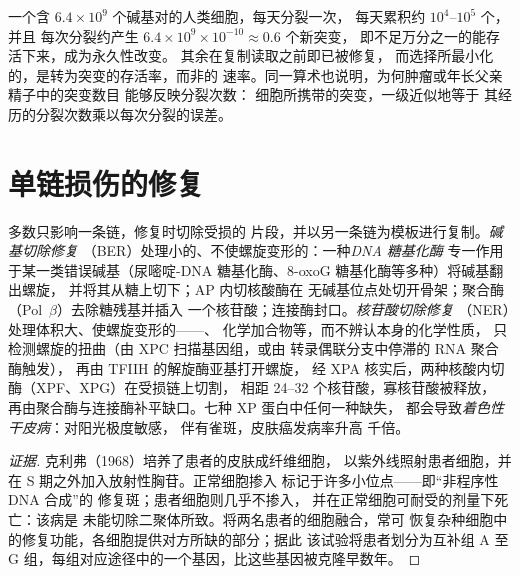 \begin{example}[损伤与突变]\label{ex:b3:dna-repair:numbers}
一个含 $6.4\times 10^{9}$ 个碱基对的人类细胞，每天分裂一次，
每天累积约 $10^{4}$--$10^{5}$ 个，并且
每次分裂约产生 $6.4\times 10^{9}\times 10^{-10} \approx 0.6$ 个新突变，
即不足万分之一的能存活下来，成为永久性改变。
其余在复制读取之前即已被修复，
而选择所最小化的，是转为突变的存活率，而非的
速率。同一算术也说明，为何肿瘤或年长父亲精子中的突变数目
能够反映分裂次数：
细胞所携带的突变，一级近似地等于
其经历的分裂次数乘以每次分裂的误差。
\end{example}

\section{单链损伤的修复}

\begin{definition}[切除修复]\label{def:b3:dna-repair:excision}
多数只影响一条链，修复时切除受损的
片段，并以另一条链为模板进行复制。\emph{碱基切除修复}
（BER）处理小的、不使螺旋变形的：一种\emph{DNA 糖基化酶}
专一作用于某一类错误碱基（尿嘧啶-DNA 糖基化酶、8-oxoG
糖基化酶等多种）将碱基翻出螺旋，
并将其从糖上切下；AP 内切核酸酶在
无碱基位点处切开骨架；聚合酶（Pol~$\beta$）去除糖残基并插入
一个核苷酸；连接酶封口。\emph{核苷酸切除修复}
（NER）处理体积大、使螺旋变形的——、
化学加合物等，而不辨认本身的化学性质，
只检测螺旋的扭曲（由 XPC 扫描基因组，或由
转录偶联分支中停滞的 RNA 聚合酶触发），
再由 TFIIH 的解旋酶亚基打开螺旋，
经 XPA 核实后，两种核酸内切酶（XPF、XPG）在受损链上切割，
相距 \numrange{24}{32} 个核苷酸，寡核苷酸被释放，
再由聚合酶与连接酶补平缺口。七种 XP 蛋白中任何一种缺失，
都会导致\emph{着色性干皮病}：对阳光极度敏感，
伴有雀斑，皮肤癌发病率升高
千倍。
\end{definition}

\begin{proof}[证据]
克利弗（1968）培养了患者的皮肤成纤维细胞，
以紫外线照射患者细胞，并
在 S 期之外加入放射性胸苷。正常细胞掺入
标记于许多小位点——即“非程序性 DNA 合成”的
修复斑；患者细胞则几乎不掺入，
并在正常细胞可耐受的剂量下死亡：该病是
未能切除二聚体所致。将两名患者的细胞融合，常可
恢复杂种细胞中的修复功能，各细胞提供对方所缺的部分；据此
该试验将患者划分为互补组 A 至
G 组，每组对应途径中的一个基因，比这些基因被克隆早数年。
\end{proof}

